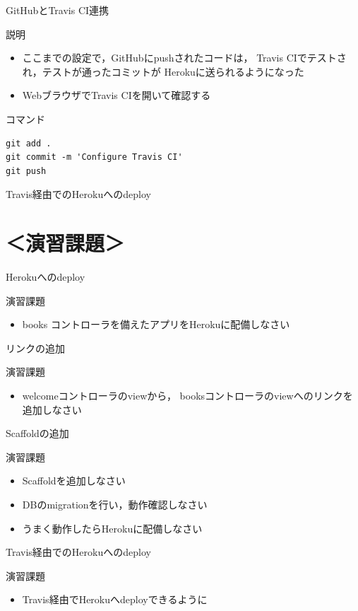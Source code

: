 \documentclass[t, aspectratio=169]{beamer}
\begin{document}
\begin{frame}[fragile,label=sec-7-3-7]{GitHubとTravis CI連携}
 \begin{block}{説明}
\begin{itemize}
\item ここまでの設定で，GitHubにpushされたコードは，
Travis CIでテストされ，テストが通ったコミットが
Herokuに送られるようになった
\item WebブラウザでTravis CIを開いて確認する
\end{itemize}
\end{block}

\begin{block}{コマンド}
\begin{verbatim}
git add .
git commit -m 'Configure Travis CI'
git push
\end{verbatim}
\end{block}
\end{frame}
\begin{frame}[label=sec-7-3-8]{Travis経由でのHerokuへのdeploy}
\end{frame}
\section{＜演習課題＞}
\label{sec-7-4}
\begin{frame}[label=sec-7-4-1]{Herokuへのdeploy}
\begin{block}{演習課題}
\begin{itemize}
\item books コントローラを備えたアプリをHerokuに配備しなさい
\end{itemize}
\end{block}
\end{frame}

\begin{frame}[label=sec-7-4-2]{リンクの追加}
\begin{block}{演習課題}
\begin{itemize}
\item welcomeコントローラのviewから，
booksコントローラのviewへのリンクを追加しなさい
\end{itemize}
\end{block}
\end{frame}

\begin{frame}[label=sec-7-4-3]{Scaffoldの追加}
\begin{block}{演習課題}
\begin{itemize}
\item Scaffoldを追加しなさい
\item DBのmigrationを行い，動作確認しなさい
\item うまく動作したらHerokuに配備しなさい
\end{itemize}
\end{block}
\end{frame}

\begin{frame}[label=sec-7-4-4]{Travis経由でのHerokuへのdeploy}
\begin{block}{演習課題}
\begin{itemize}
\item Travis経由でHerokuへdeployできるように
\end{itemize}
\end{block}
\end{frame}
\end{document}
